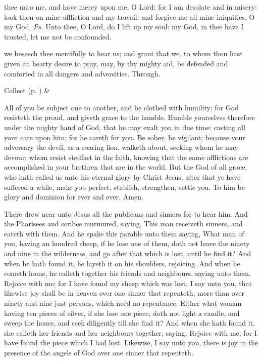 \introit
{} thee unto me, and have mercy upon me, O Lord: for I am desolate and in misery: look thou on mine affliction and my travail: and forgive me all mine iniquities, O my God. \textit{Ps.} Unto thee, O Lord, do I lift up my soul: my God, in thee have I trusted, let me not be confounded.

\collect\label{TrinityIIICollect}
 we beseech thee mercifully to hear us; and grant that we, to whom thou hast given an hearty desire to pray, may, by thy mighty aid, be defended and comforted in all dangers and adversities. Through.
\begin{rubric}
     Collect  (p. \pageref{SPSaints}) \&  
\end{rubric}

 All of you be subject one to another, and be clothed with humility: for God resisteth the proud, and giveth grace to the humble. Humble yourselves therefore under the mighty hand of God, that he may exalt you in due time: casting all your care upon him; for he careth for you. Be sober, be vigilant; because your adversary the devil, as a roaring lion, walketh about, seeking whom he may devour: whom resist stedfast in the faith, knowing that the same afflictions are accomplished in your brethren that are in the world. But the God of all grace, who hath called us unto his eternal glory by Christ Jesus, after that ye have suffered a while, make you perfect, stablish, strengthen, settle you. To him be glory and dominion for ever and ever. Amen.


\clearpage
{}
 There drew near unto Jesus all the publicans and sinners for to hear him. And the Pharisees and scribes murmured, saying, This man receiveth sinners, and eateth with them. And he spake this parable unto them saying, What man of you, having an hundred sheep, if he lose one of them, doth not leave the ninety and nine in the wilderness, and go after that which is lost, until he find it? And when he hath found it, he layeth it on his shoulders, rejoicing. And when he cometh home, he calleth together his friends and neighbours, saying unto them, Rejoice with me; for I have found my sheep which was lost. I say unto you, that likewise joy shall be in heaven over one sinner that repenteth, more than over ninety and nine just persons, which need no repentance. Either what woman having ten pieces of silver, if she lose one piece, doth not light a candle, and sweep the house, and seek diligently till she find it? And when she hath found it, she calleth her friends and her neighbours together, saying, Rejoice with me; for I have found the piece which I had lost. Likewise, I say unto you, there is joy in the presence of the angels of God over one sinner that repenteth.

